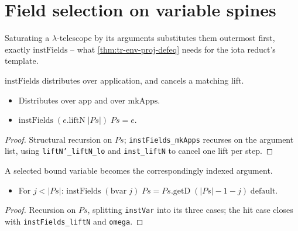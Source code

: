 \section{Field selection on variable spines}

Saturating a $\lambda$-telescope by its arguments substitutes them outermost first, exactly
$\mathrm{instFields}$ -- what \ref{thm:tr-env-proj-defeq} needs for the iota reduct's template.

\begin{lemma}
  \label{fam:proj-instfields-spine}
  \leanok

   $\mathrm{instFields}$ distributes over application, and cancels a matching lift.
  \begin{itemize}
  \item Distributes over $\mathrm{app}$ and over $\mathrm{mkApps}$.
  \item $\mathrm{instFields}\;(e.\mathrm{liftN}\;|Ps|)\;Ps = e$.
  \end{itemize}
\end{lemma}
\begin{proof}
  \leanok
   Structural recursion on $Ps$; \texttt{instFields\_mkApps} recurses on the argument
  list, using \texttt{liftN'\_liftN\_lo} and \texttt{inst\_liftN} to cancel one lift per step.
\end{proof}

\begin{lemma}
  \label{thm:proj-instfields-bvar}
  \leanok

   A selected bound variable becomes the correspondingly indexed argument.
  \begin{itemize}
  \item For $j<|Ps|$: $\mathrm{instFields}\;(\mathrm{bvar}\;j)\;Ps = Ps.\mathrm{getD}\;
        (|Ps|-1-j)\;\mathrm{default}$.
  \end{itemize}
\end{lemma}
\begin{proof}
  \leanok
   Recursion on $Ps$, splitting \texttt{instVar} into its three cases; the hit case
  closes with \texttt{instFields\_liftN} and \texttt{omega}.
\end{proof}

